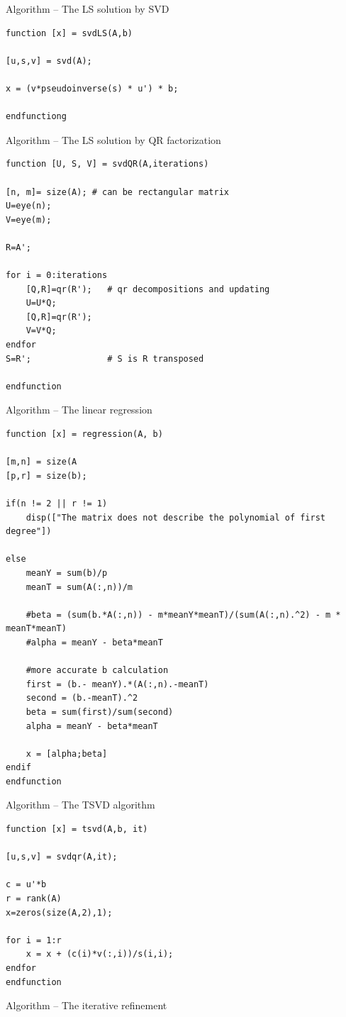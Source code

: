 \documentclass[eng,openany]{mgr}
\begin{document}
Algorithm  -- The LS solution by SVD\\

\begin{lstlisting}
function [x] = svdLS(A,b)

[u,s,v] = svd(A);

x = (v*pseudoinverse(s) * u') * b;

endfunctiong
\end{lstlisting}
Algorithm  -- The LS solution by QR factorization\\
\begin{lstlisting}
function [U, S, V] = svdQR(A,iterations)

[n, m]= size(A); # can be rectangular matrix
U=eye(n);   
V=eye(m);

R=A';  

for i = 0:iterations
	[Q,R]=qr(R');   # qr decompositions and updating  
	U=U*Q;         
	[Q,R]=qr(R');
	V=V*Q;
endfor
S=R';               # S is R transposed

endfunction
\end{lstlisting}
\newpage
Algorithm  -- The linear regression\\
\begin{lstlisting}
function [x] = regression(A, b)

[m,n] = size(A
[p,r] = size(b);

if(n != 2 || r != 1)
	disp(["The matrix does not describe the polynomial of first degree"])

else
	meanY = sum(b)/p
	meanT = sum(A(:,n))/m
	
	#beta = (sum(b.*A(:,n)) - m*meanY*meanT)/(sum(A(:,n).^2) - m * meanT*meanT)
	#alpha = meanY - beta*meanT
	
	#more accurate b calculation
	first = (b.- meanY).*(A(:,n).-meanT)
	second = (b.-meanT).^2
	beta = sum(first)/sum(second)
	alpha = meanY - beta*meanT
	
	x = [alpha;beta]
endif
endfunction
\end{lstlisting}
Algorithm  -- The TSVD algorithm\\
\begin{lstlisting}
function [x] = tsvd(A,b, it)

[u,s,v] = svdqr(A,it);

c = u'*b
r = rank(A)
x=zeros(size(A,2),1);

for i = 1:r
	x = x + (c(i)*v(:,i))/s(i,i);
endfor
endfunction
\end{lstlisting}
Algorithm  -- The iterative refinement\\
\end{document}
